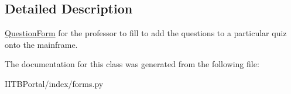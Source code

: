 \subsection{Detailed Description}
\hyperlink{classindex_1_1forms_1_1QuestionForm}{Question\+Form} for the professor to fill to add the questions to a particular quiz onto the mainframe. 



The documentation for this class was generated from the following file\+:\begin{DoxyCompactItemize}
\item 
I\+I\+T\+B\+Portal/index/forms.\+py\end{DoxyCompactItemize}
